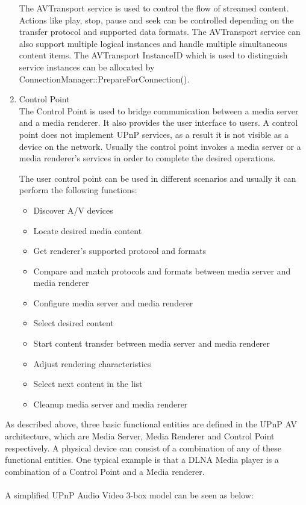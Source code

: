 \begin{enumerate}
The AVTransport service is used to control the flow of streamed content. Actions 
like play, stop, pause and seek can be controlled depending on the transfer 
protocol and supported data formats. The AVTransport service can also support 
multiple logical instances and handle multiple simultaneous content items. The 
AVTransport InstanceID which is used to distinguish service instances can be 
allocated by ConnectionManager::PrepareForConnection(). 

\item Control Point \\ 
The Control Point is used to bridge communication between a media server and a media renderer. 
It also provides the user interface to users. A control point does not implement UPnP 
services, as a result it is not visible as a device on the network. Usually the control point 
invokes a media server or a media renderer's services in order to complete the 
desired operations.

The user control point can be used in different scenarios and usually it can 
perform the following functions: 

\begin{itemize} 
\item Discover A/V devices 
\item Locate desired media content 
\item Get renderer's supported protocol and formats 
\item Compare and match protocols and formats between media server and media 
renderer 
\item Configure media server and media renderer 
\item Select desired content 
\item Start content transfer between media server and media renderer 
\item Adjust rendering characteristics 
\item Select next content in the list 
\item Cleanup media server and media renderer 
\end{itemize} 

\end{enumerate} 

As described above, three basic functional entities are defined in the UPnP AV 
architecture\cite{upnp-av}, which are Media Server, Media Renderer and Control Point respectively.
A physical device can consist of a combination of any of these functional 
entities. One typical example is that a DLNA Media player is a combination of a Control 
Point and a Media renderer. \\
\\
A simplified UPnP Audio Video 3-box model \cite{DLNA_proxy} can be 
seen as below: 

